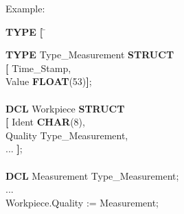 Example:

\begin{tabbing}
{\bf TYPE} \= {\bf [} \= \kill

{\bf TYPE} \>         \> Type\_Measurement {\bf STRUCT}\\
    \> {\bf [} \> Time\_Stamp, \\
    \>         \> Value {\bf FLOAT}(53){\bf ]};\\
    \>         \> \\
{\bf DCL}  \>         \> Workpiece {\bf STRUCT} \\
    \> {\bf [} \> Ident {\bf CHAR}(8),\\
    \>         \> Quality Type\_Measurement,\\
    \>         \> ... {\bf ]};\\
    \>         \> \\
{\bf DCL}  \>         \> Measurement Type\_Measurement;\\
...        \>         \> \\
Workpiece.Quality := Measurement;
\end{tabbing}

